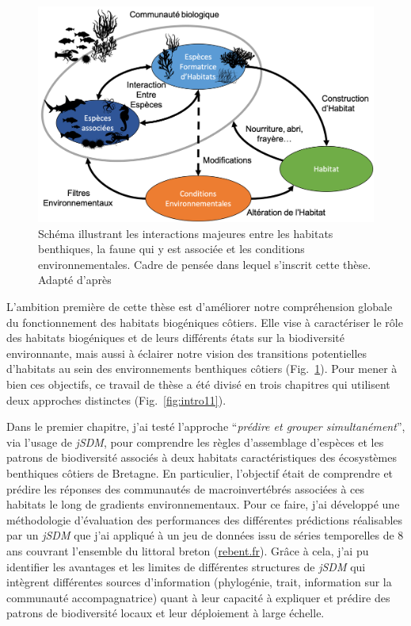 \begin{refsection}
\begin{figure}
\hypertarget{fig:intro10}{%
\centering
\includegraphics{02-Introduction/figures/research_framework.png}
\caption[Schéma illustrant les interactions majeures entre les habitats
benthiques, la faune et les conditions environnementales]{Schéma illustrant les interactions majeures entre les habitats
benthiques, la faune qui y est associée et les conditions
environnementales. Cadre de pensée dans lequel s'inscrit cette thèse.
Adapté d'après \textcite{Marzloff_2022}}\label{fig:intro10}
}
\end{figure}

L'ambition première de cette thèse est d'améliorer notre compréhension
globale du fonctionnement des habitats biogéniques côtiers. Elle vise à
caractériser le rôle des habitats biogéniques et de leurs différents
états sur la biodiversité environnante, mais aussi à éclairer notre
vision des transitions potentielles d'habitats au sein des
environnements benthiques côtiers (Fig.~\ref{fig:intro10}). Pour mener à
bien ces objectifs, ce travail de thèse a été divisé en trois chapitres
qui utilisent deux approches distinctes (Fig.~\ref{fig:intro11}).

Dans le premier chapitre, j'ai testé l'approche ``\emph{prédire et
grouper simultanément}'', via l'usage de \emph{jSDM}, pour comprendre
les règles d'assemblage d'espèces et les patrons de biodiversité
associés à deux habitats caractéristiques des écosystèmes benthiques
côtiers de Bretagne. En particulier, l'objectif était de comprendre et
prédire les réponses des communautés de macroinvertébrés associées à ces
habitats le long de gradients environnementaux. Pour ce faire, j'ai
développé une méthodologie d'évaluation des performances des différentes
prédictions réalisables par un \emph{jSDM} que j'ai appliqué à un jeu de
données issu de séries temporelles de 8 ans couvrant l'ensemble du
littoral breton (\href{http://rebent.ifremer.fr}{rebent.fr}). Grâce à
cela, j'ai pu identifier les avantages et les limites de différentes
structures de \emph{jSDM} qui intègrent différentes sources
d'information (phylogénie, trait, information sur la communauté
accompagnatrice) quant à leur capacité à expliquer et prédire des
patrons de biodiversité locaux et leur déploiement à large échelle.


\end{refsection}

